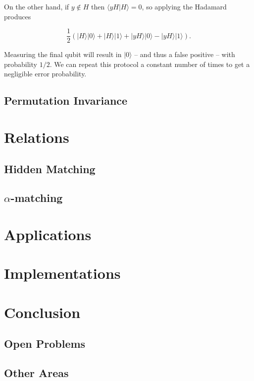 \documentclass[a4paper]{article}
\begin{document}
        On the other hand, if $y \notin H$ then $\langle yH|H\rangle = 0$, so applying the Hadamard produces

        $$\frac{1}{2}(|H\rangle|0\rangle + |H\rangle|1\rangle + |yH\rangle|0\rangle - |yH\rangle|1\rangle).$$

        Measuring the final qubit will result in $|0\rangle$ -- and thus a false positive -- with probability $1/2$. We can repeat this protocol a constant number of times to get a negligible error probability.

        \subsection{Permutation Invariance}

    \section{Relations}

        \subsection{Hidden Matching}

        \subsection{$\alpha$-matching}

    \section{Applications}

    \section{Implementations}

    \section{Conclusion}

        \subsection{Open Problems}

        \subsection{Other Areas}

    
    {}
\end{document}
